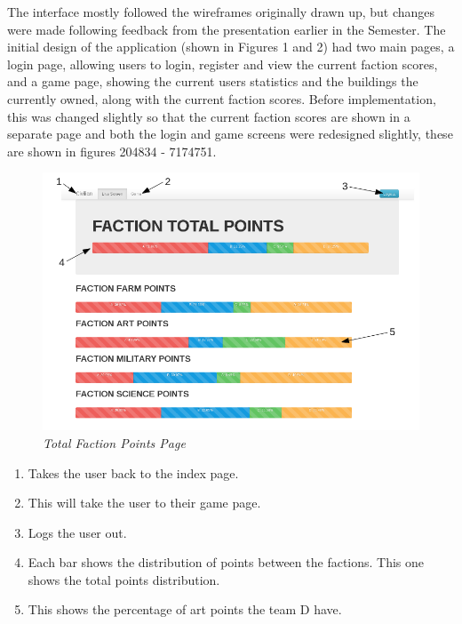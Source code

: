 \documentclass{sig-alt-release2}
\begin{document}
The interface mostly followed the wireframes originally drawn up, but changes were made following feedback from the presentation earlier in the Semester. The initial design of the application (shown in Figures 1 and 2) had two main pages, a login page, allowing users to login, register and view the current faction scores, and a game page, showing the current users statistics and the buildings the currently owned, along with the current faction scores. Before implementation, this was changed slightly so that the current faction scores are shown in a separate page and both the login and game screens were redesigned slightly, these are shown in figures 204834 - 7174751.\\

\begin{figure}[!htbp]
  \caption{\textit{Total Faction Points Page}}
  \begin{center}
		\includegraphics[scale=0.30]{img/factionlabel.png}
  \end{center}
\end{figure}


\begin{enumerate}
\item Takes the user back to the index page. 
\item This will take the user to their game page.
\item Logs the user out.
\item Each bar shows the distribution of points between the factions. This one shows the total points distribution.
\item This shows the percentage of art points the team D have.
\end{enumerate}
\end{document}
